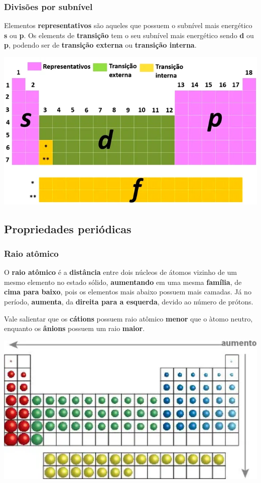 \documentclass{article}
\begin{document}
\subsubsection{Divisões por subnível}
Elementos \textbf{representativos} são aqueles que possuem o subnível mais energético \textbf{s} ou \textbf{p}. Os elements de \textbf{transição} tem o seu subnível mais energético sendo \textbf{d} ou \textbf{p}, podendo ser de \textbf{transição externa} ou \textbf{transição interna}.
\begin{center}
    \includegraphics[width=1\textwidth]{tabela_periodica_divisoes_subnivel}
\end{center}

\subsection{Propriedades periódicas}
\subsubsection{Raio atômico}
O \textbf{raio atômico} é a \textbf{distância} entre dois núcleos de átomos vizinho de um mesmo elemento no estado sólido,
\textbf{aumentando} em uma mesma \textbf{família}, de \textbf{cima para baixo}, pois os elementos mais abaixo possuem mais camadas.
Já no período, \textbf{aumenta}, da \textbf{direita para a esquerda}, devido ao número de prótons.

Vale salientar que os \textbf{cátions} possuem raio atômico \textbf{menor} que o àtomo neutro, enquanto os \textbf{ânions} possuem um raio \textbf{maior}.

\begin{center}
    \includegraphics[width=1\textwidth]{tabela_periodica_raio_atomico}
\end{center}
\end{document}

